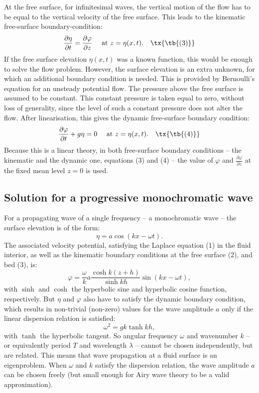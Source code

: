 \documentclass[a4paper,12pt]{report}
\begin{document}
At the free surface, for infinitesimal waves, the vertical motion of the flow has to be equal to the vertical velocity of the free surface. This leads to the kinematic free-surface boundary-condition:
\begin{equation}
\frac{\partial \eta}{\partial t} = \frac{\partial \varphi}{\partial z} \quad \text{ at } z = \eta(x,t).\quad\tx{\tb{(3)}}
\end{equation}
If the free surface elevation \( \eta(x,t) \) was a known function, this would be enough to solve the flow problem. However, the surface elevation is an extra unknown, for which an additional boundary condition is needed. This is provided by Bernoulli's equation for an unsteady potential flow. The pressure above the free surface is assumed to be constant. This constant pressure is taken equal to zero, without loss of generality, since the level of such a constant pressure does not alter the flow. After linearisation, this gives the dynamic free-surface boundary condition:
\begin{equation}
\frac{\partial \varphi}{\partial t} + g \eta = 0 \quad \text{ at } z = \eta(x,t).\quad\tx{\tb{(4)}}
\end{equation}
Because this is a linear theory, in both free-surface boundary conditions – the kinematic and the dynamic one, equations (3) and (4) – the value of \( \varphi \) and \( \frac{\partial \varphi}{\partial z} \) at the fixed mean level \( z = 0 \) is used.
\subsection{Solution for a progressive monochromatic wave}
For a propagating wave of a single frequency – a monochromatic wave – the surface elevation is of the form:
\[
\eta = a \cos ( k x - \omega t ).
\]
The associated velocity potential, satisfying the Laplace equation (1) in the fluid interior, as well as the kinematic boundary conditions at the free surface (2), and bed (3), is:
\[
\varphi = \frac{\omega}{k} a \frac{\cosh k (z+h) }{\sinh k h} \sin ( k x - \omega t),
\]
with \( \sinh \) and \( \cosh \) the hyperbolic sine and hyperbolic cosine function, respectively. But \( \eta \) and \( \varphi \) also have to satisfy the dynamic boundary condition, which results in non-trivial (non-zero) values for the wave amplitude \( a \) only if the linear dispersion relation is satisfied:
\[
\omega^2 = g k \tanh k h,
\]
with \( \tanh \) the hyperbolic tangent. So angular frequency \( \omega \) and wavenumber \( k \) – or equivalently period \( T \) and wavelength \( \lambda \) – cannot be chosen independently, but are related. This means that wave propagation at a fluid surface is an eigenproblem. When \( \omega \) and \( k \) satisfy the dispersion relation, the wave amplitude \( a \) can be chosen freely (but small enough for Airy wave theory to be a valid approximation).
\end{document}
